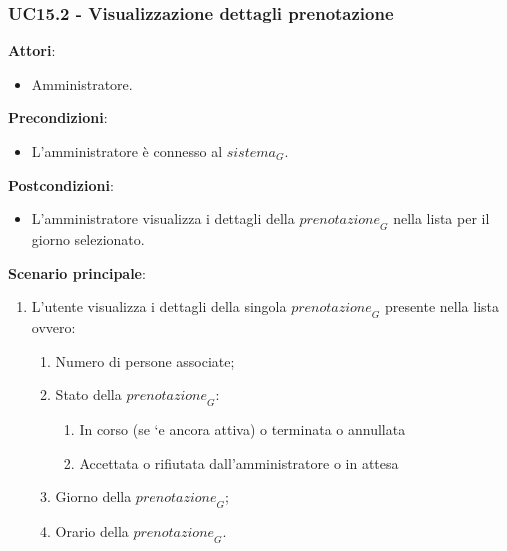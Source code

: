 \subsubsection{UC15.2 - Visualizzazione dettagli prenotazione}\label{usecase:15_2}
\textbf{Attori}:
\begin{itemize}
    \item Amministratore.
\end{itemize}
\textbf{Precondizioni}:
\begin{itemize}
    \item L'amministratore è connesso al $\textit{sistema}_G$.
\end{itemize}
\textbf{Postcondizioni}:
\begin{itemize}
    \item L'amministratore visualizza i dettagli della $\textit{prenotazione}_G$ nella lista per il giorno selezionato.
\end{itemize}
\textbf{Scenario principale}:
\begin{enumerate}
    \item L'utente visualizza i dettagli della singola $\textit{prenotazione}_G$ presente nella lista ovvero:
    \begin{enumerate}
        \item Numero di persone associate;
        \item Stato della $\textit{prenotazione}_G$:
         \begin{enumerate}
           \item In corso (se `e ancora attiva) o terminata o annullata
            \item Accettata o rifiutata dall’amministratore o in attesa
       \end{enumerate}
    \item Giorno della $\textit{prenotazione}_G$;
    \item Orario della $\textit{prenotazione}_G$.
    \end{enumerate}
\end{enumerate}
\newpage